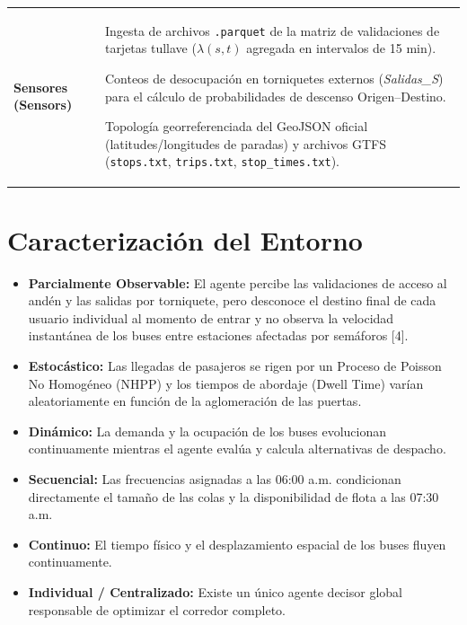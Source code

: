 \documentclass{article}
\begin{document}
\begin{longtable}{|>{\bfseries}p{} |p{}|}
    Sensores (Sensors)
    &
        Ingesta de archivos \texttt{.parquet} de la matriz de
        validaciones de tarjetas tullave
        (\(\lambda(s,t)\) agregada en intervalos de 15 min).

        Conteos de desocupación en torniquetes externos
        (\textit{Salidas\_S}) para el cálculo de probabilidades de
        descenso Origen--Destino.

        Topología georreferenciada del GeoJSON oficial
        (latitudes/longitudes de paradas) y archivos GTFS
        (\texttt{stops.txt}, \texttt{trips.txt},
        \texttt{stop\_times.txt}).
    \\

\end{longtable}

\section{Caracterización del Entorno}

\begin{itemize}
  \item \textbf{Parcialmente Observable:} El agente percibe las validaciones de acceso al andén y las salidas por torniquete, pero desconoce el destino final de cada usuario individual al momento de entrar y no observa la velocidad instantánea de los buses entre estaciones afectadas por semáforos [4].

  \item \textbf{Estocástico:} Las llegadas de pasajeros se rigen por un Proceso de Poisson No Homogéneo (NHPP) y los tiempos de abordaje (Dwell Time) varían aleatoriamente en función de la aglomeración de las puertas.

  \item \textbf{Dinámico:} La demanda y la ocupación de los buses evolucionan continuamente mientras el agente evalúa y calcula alternativas de despacho.

  \item \textbf{Secuencial:} Las frecuencias asignadas a las 06:00 a.m. condicionan directamente el tamaño de las colas y la disponibilidad de flota a las 07:30 a.m.

  \item \textbf{Continuo:} El tiempo físico y el desplazamiento espacial de los buses fluyen continuamente.

  \item \textbf{Individual / Centralizado:} Existe un único agente decisor global responsable de optimizar el corredor completo.

\end{itemize}
\end{document}
